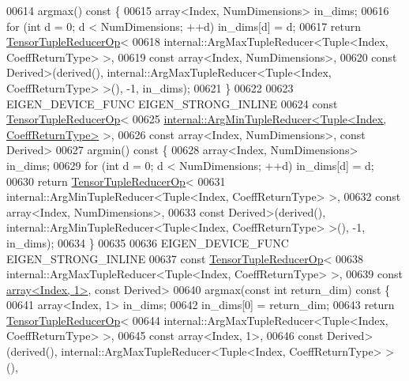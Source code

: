 \begin{DoxyCode}
00614     argmax()\textcolor{keyword}{ const }\{
00615       array<Index, NumDimensions> in\_dims;
00616       \textcolor{keywordflow}{for} (\textcolor{keywordtype}{int} d = 0; d < NumDimensions; ++d) in\_dims[d] = d;
00617       \textcolor{keywordflow}{return} \hyperlink{class_eigen_1_1_tensor_tuple_reducer_op}{TensorTupleReducerOp}<
00618         internal::ArgMaxTupleReducer<Tuple<Index, CoeffReturnType> >,
00619         \textcolor{keyword}{const} array<Index, NumDimensions>,
00620         \textcolor{keyword}{const} Derived>(derived(), internal::ArgMaxTupleReducer<Tuple<Index, CoeffReturnType> >(), -1, 
      in\_dims);
00621     \}
00622 
00623     EIGEN\_DEVICE\_FUNC EIGEN\_STRONG\_INLINE
00624     \textcolor{keyword}{const} \hyperlink{class_eigen_1_1_tensor_tuple_reducer_op}{TensorTupleReducerOp}<
00625       \hyperlink{struct_eigen_1_1internal_1_1_arg_min_tuple_reducer}{internal::ArgMinTupleReducer<Tuple<Index, CoeffReturnType>}
       >,
00626       \textcolor{keyword}{const} array<Index, NumDimensions>, \textcolor{keyword}{const} Derived>
00627     argmin()\textcolor{keyword}{ const }\{
00628       array<Index, NumDimensions> in\_dims;
00629       \textcolor{keywordflow}{for} (\textcolor{keywordtype}{int} d = 0; d < NumDimensions; ++d) in\_dims[d] = d;
00630       \textcolor{keywordflow}{return} \hyperlink{class_eigen_1_1_tensor_tuple_reducer_op}{TensorTupleReducerOp}<
00631         internal::ArgMinTupleReducer<Tuple<Index, CoeffReturnType> >,
00632         \textcolor{keyword}{const} array<Index, NumDimensions>,
00633         \textcolor{keyword}{const} Derived>(derived(), internal::ArgMinTupleReducer<Tuple<Index, CoeffReturnType> >(), -1, 
      in\_dims);
00634     \}
00635 
00636     EIGEN\_DEVICE\_FUNC EIGEN\_STRONG\_INLINE
00637     \textcolor{keyword}{const} \hyperlink{class_eigen_1_1_tensor_tuple_reducer_op}{TensorTupleReducerOp}<
00638       internal::ArgMaxTupleReducer<Tuple<Index, CoeffReturnType> >,
00639       \textcolor{keyword}{const} \hyperlink{class_eigen_1_1array}{array<Index, 1>}, \textcolor{keyword}{const} Derived>
00640     argmax(\textcolor{keyword}{const} \textcolor{keywordtype}{int} return\_dim)\textcolor{keyword}{ const }\{
00641       array<Index, 1> in\_dims;
00642       in\_dims[0] = return\_dim;
00643       \textcolor{keywordflow}{return} \hyperlink{class_eigen_1_1_tensor_tuple_reducer_op}{TensorTupleReducerOp}<
00644         internal::ArgMaxTupleReducer<Tuple<Index, CoeffReturnType> >,
00645         \textcolor{keyword}{const} array<Index, 1>,
00646         \textcolor{keyword}{const} Derived>(derived(), internal::ArgMaxTupleReducer<Tuple<Index, CoeffReturnType> >(), 

\end{DoxyCode}

